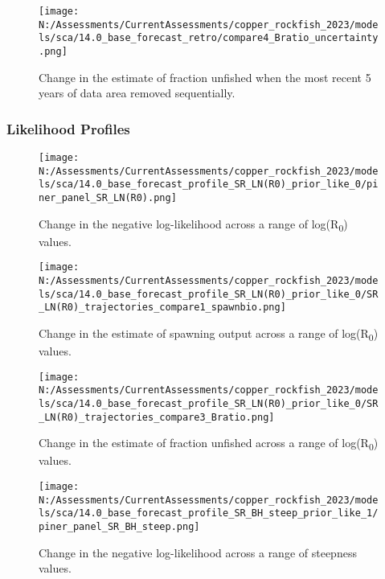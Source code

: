 \documentclass[11pt,
  english,
  letterpaper,
]{article}
\begin{document}
\pagebreak

\begin{figure}
\centering
\texttt{[image: N:/Assessments/CurrentAssessments/copper\_rockfish\_2023/models/sca/14.0\_base\_forecast\_retro/compare4\_Bratio\_uncertainty.png]}
\caption{Change in the estimate of fraction unfished when the most recent 5 years of data area removed sequentially.\label{fig:retro-depl}}
\end{figure}

\hypertarget{likelihood-profiles-1}{%
\subsubsection{Likelihood Profiles}\label{likelihood-profiles-1}}

\begin{figure}
\centering
\texttt{[image: N:/Assessments/CurrentAssessments/copper\_rockfish\_2023/models/sca/14.0\_base\_forecast\_profile\_SR\_LN(R0)\_prior\_like\_0/piner\_panel\_SR\_LN(R0).png]}
\caption{Change in the negative log-likelihood across a range of log(R\textsubscript{0}) values.\label{fig:r0-profile}}
\end{figure}

\pagebreak

\begin{figure}
\centering
\texttt{[image: N:/Assessments/CurrentAssessments/copper\_rockfish\_2023/models/sca/14.0\_base\_forecast\_profile\_SR\_LN(R0)\_prior\_like\_0/SR\_LN(R0)\_trajectories\_compare1\_spawnbio.png]}
\caption{Change in the estimate of spawning output across a range of log(R\textsubscript{0}) values.\label{fig:r0-ssb}}
\end{figure}

\pagebreak

\begin{figure}
\centering
\texttt{[image: N:/Assessments/CurrentAssessments/copper\_rockfish\_2023/models/sca/14.0\_base\_forecast\_profile\_SR\_LN(R0)\_prior\_like\_0/SR\_LN(R0)\_trajectories\_compare3\_Bratio.png]}
\caption{Change in the estimate of fraction unfished across a range of log(R\textsubscript{0}) values.\label{fig:r0-depl}}
\end{figure}

\pagebreak

\begin{figure}
\centering
\texttt{[image: N:/Assessments/CurrentAssessments/copper\_rockfish\_2023/models/sca/14.0\_base\_forecast\_profile\_SR\_BH\_steep\_prior\_like\_1/piner\_panel\_SR\_BH\_steep.png]}
\caption{Change in the negative log-likelihood across a range of steepness values.\label{fig:h-profile}}
\end{figure}
\end{document}
